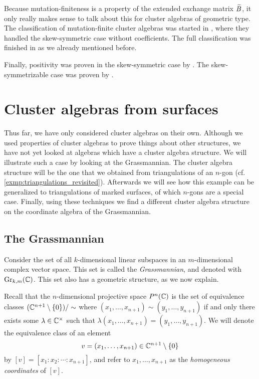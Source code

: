 Because mutation-finiteness is a property of the extended exchange matrix $\widetilde{B}$, it
only really makes sense to talk about this for cluster algebras of geometric type. The
classification of mutation-finite cluster algebras was started in
\cite{FeliksonShapiroTumarkin2012SkewSCA}, where they handled the skew-symmetric case
without coefficients. The full classification was finished in
\cite{FeliksonPavel2023cluster} as we already mentioned before.

Finally, positivity was proven in the skew-symmetric case by
\textcite{LeeSchiffler2015PositivityCA}. The skew-symmetrizable case was proven by
\textcite{GrossHackingKeelKontsevich2018CanonicalBCA}.

\section{Cluster algebras from surfaces}\label{sec:cluster_algebras_surfaces}

Thus far, we have only considered cluster algebras on their own. Although we used
properties of cluster algebras to prove things about other structures, we have not yet
looked at algebras which have a cluster algebra structure. We will illustrate such a
case by looking at the Grassmannian. The cluster algebra structure will be the one that
we obtained from triangulations of an $n$-gon (cf.
\cref{exmp:triangulations_revisited}). Afterwards we will see how this example can be
generalized to triangulations of marked surfaces, of which $n$-gons are a special case.
Finally, using these techniques we find a different cluster algebra structure on the
coordinate algebra of the Grassmannian.

\subsection{The Grassmannian}

Consider the set of all $k$-dimensional linear subspaces in an $m$-dimensional complex
vector space. This set is called the \emph{Grassmannian}, and
denoted with $\operatorname{Gr}_{k,m}(\mathbb{C})$. This set also has a
geometric structure, as we now explain.

Recall that the $n$-dimensional projective space $P^n(\mathbb{C})$ is the set of equivalence
classes $(\mathbb{C}^{n+1} \setminus \{0\}) / \sim$ where $ (x_1, \dots, x_{n+1}) \sim (y_1,
	\dots, y_{n+1})$ if and only there exists some $\lambda \in \mathbb{C}^\times$ such that
$\lambda(x_1, \dots, x_{n+1}) = (y_1, \dots, y_{n+1})$. We will denote the equivalence
class of an element
\begin{equation*}
	v = (x_1, \dots, x_{n+1}) \in \mathbb{C}^{n+1} \setminus \{0\}
\end{equation*}
%
by $[v] = [x_1 \colon x_2 \colon \dotsb \colon x_{n+1}]$, and refer to $x_1, \dots,
	x_{n+1}$ as the \emph{homogeneous coordinates} of $[v]$.

